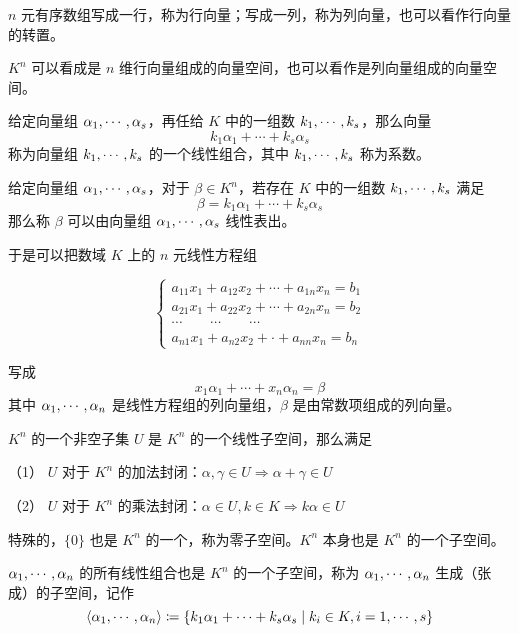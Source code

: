 $n$ 元有序数组写成一行，称为行向量；写成一列，称为列向量，也可以看作行向量的转置。

$K^n$ 可以看成是 $n$ 维行向量组成的向量空间，也可以看作是列向量组成的向量空间。

\begin{definition}[线性组合]
	给定向量组 $\alpha_1,\cdots,\alpha_s$，再任给 $K$ 中的一组数 $k_1,\cdots,k_s$，那么向量
	\[k_1 \alpha_1+\cdots+k_s \alpha_s\]
	称为向量组 $k_1,\cdots,k_s$ 的一个线性组合，其中 $k_1,\cdots,k_s$ 称为系数。
\end{definition}

\begin{definition}[线性表出]
	给定向量组 $\alpha_1,\cdots,\alpha_s$，对于 $\beta \in K^n$，若存在 $K$ 中的一组数 $k_1,\cdots,k_s$ 满足
	\[\beta = k_1\alpha_1+\cdots+k_s\alpha_s\]
	那么称 $\beta$ 可以由向量组 $\alpha_1,\cdots,\alpha_s$ 线性表出。
\end{definition}

于是可以把数域 $K$ 上的 $n$ 元线性方程组

\begin{equation*}
	\left\{
		\begin{matrix}
			a_{11}x_1+a_{12}x_2+\cdots+a_{1n}x_n=b_1\\
			a_{21}x_1+a_{22}x_2+\cdots+a_{2n}x_n=b_2\\
			\cdots\qquad\cdots\qquad\cdots\\
			a_{n1}x_1+a_{n2}x_2+\cdot +a_{nn}x_n=b_n
		\end{matrix}
	\right.
\end{equation*}

写成
\[x_1\alpha_1+\cdots+x_n\alpha_n=\beta\]
其中 $\alpha_1,\cdots,\alpha_n$ 是线性方程组的列向量组，$\beta$ 是由常数项组成的列向量。

\begin{definition}[线性子空间]
	$K^n$ 的一个非空子集 $U$ 是 $K^n$ 的一个线性子空间，那么满足
	
	（1） $U$ 对于 $K^n$ 的加法封闭：$\alpha,\gamma\in U \Rightarrow \alpha+\gamma \in U$

	（2） $U$ 对于 $K^n$ 的乘法封闭：$\alpha \in U,k\in K \Rightarrow k\alpha \in U$
\end{definition}

特殊的，$\{0\}$ 也是 $K^n$ 的一个，称为零子空间。$K^n$ 本身也是 $K^n$ 的一个子空间。

$\alpha_1,\cdots,\alpha_n$ 的所有线性组合也是 $K^n$ 的一个子空间，称为 $\alpha_1,\cdots,\alpha_n$ 生成（张成）的子空间，记作
\[\langle \alpha_1,\cdots,\alpha_n\rangle\coloneqq \{k_1\alpha_1+\cdots+k_s\alpha_s \mid k_i\in K,i=1,\cdots,s\}\]

